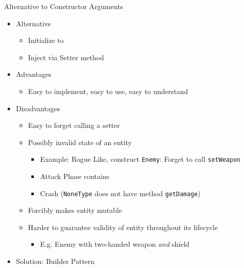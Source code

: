 \begin{frame}{Alternative to Constructor Arguments}
%
\begin{itemize}
\item Alternative
	\begin{itemize}
	\item Initialize to 
	\item Inject via Setter method
	\end{itemize}
\pause
\item Advantages
	\begin{itemize}
	\item Easy to implement, easy to use, easy to understand
	\end{itemize}
\pause
\item Disadvantages
	\begin{itemize}
	\item Easy to forget calling a setter
	\item[\Thus] Possibly invalid state of an entity
		\begin{itemize}
		\item Example: Rogue Like, construct \texttt{Enemy}: Forget to call \texttt{setWeapon}
		\item Attack Phase contains 
		\item[\Thus] Crash (\texttt{NoneType} does not have method \texttt{getDamage})
		\end{itemize}
\pause
	\item Forcibly makes entity mutable
	\item[\Thus] Harder to guarantee validity of entity throughout its lifecycle
		\begin{itemize}
		\item E.\;g. Enemy with two-handed weapon \emph{and} shield
		\end{itemize}
	\end{itemize}
\pause
\item Solution: Builder Pattern
\end{itemize}
%
\end{frame}



